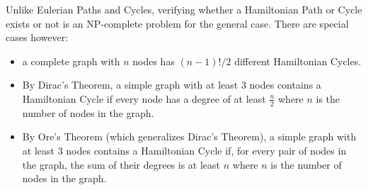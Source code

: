 Unlike Eulerian Paths and Cycles, verifying whether a Hamiltonian Path or Cycle exists or not is an NP-complete problem for the general case. There are special cases however:
\begin{itemize}
\item a complete graph with $n$ nodes has $(n-1)!/2$ different Hamiltonian Cycles.
\item By Dirac's Theorem, a simple graph with at least 3 nodes contains a Hamiltonian Cycle if every node has a degree of at least $\frac{n}{2}$ where $n$ is the number of nodes in the graph.
\item By Ore's Theorem (which generalizes Dirac's Theorem), a simple graph with at least 3 nodes contains a Hamiltonian Cycle if, for every pair of nodes in the graph, the sum of their degrees is at least $n$ where $n$ is the number of nodes in the graph.
\end{itemize}